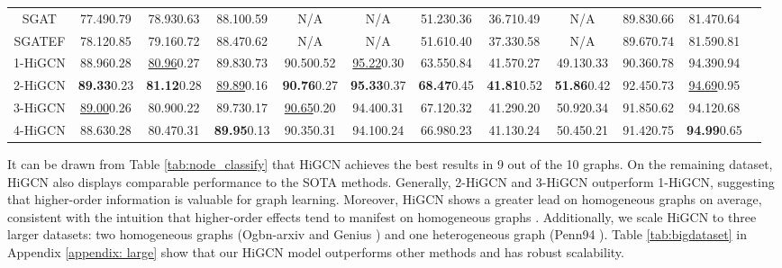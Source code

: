 \documentclass[letterpaper]{article} \usepackage{aaai24}
\newcommand \spm[1] {\footnotesize{#1} }
\newcommand \f[1]{\textbf{#1}}
\newcommand \s[1]{\underline{#1}}
\newcommand \thi[1]{#1}
\theoremstyle{plain}
\theoremstyle{definition}
\theoremstyle{remark}
\begin{document}
\begin{table*}[!ht]
{\begin{tabular}{cccccccccccc}
SGAT &77.49\spm{0.79}  &78.93\spm{0.63} &88.10\spm{0.59} &N/A           &N/A               &51.23\spm{0.36}  &36.71\spm{0.49}  &N/A            &89.83\spm{0.66}  &81.47\spm{0.64}\\
SGATEF &78.12\spm{0.85}  &79.16\spm{0.72} &88.47\spm{0.62} &N/A           &N/A               &51.61\spm{0.40}  &37.33\spm{0.58}  &N/A            &89.67\spm{0.74}  &81.59\spm{0.81}\\
1-HiGCN
&\thi{88.96}\spm{0.28}  &\s{80.96}\spm{0.27}  &\thi{89.83}\spm{0.73}  &\thi{90.50}\spm{0.52}  &\s{95.22}\spm{0.30} &63.55\spm{0.84}  &\thi{41.57}\spm{0.27}  &49.13\spm{0.33}  &90.36\spm{0.78} &\thi{94.39}\spm{0.94}\\
2-HiGCN
&\f{89.33}\spm{0.23}  &\f{81.12}\spm{0.28}  &\s{89.89}\spm{0.16}  &\f{90.76}\spm{0.27}  &\f{95.33}\spm{0.37}  &\f{68.47}\spm{0.45}  &\f{41.81}\spm{0.52}  &\f{51.86}\spm{0.42}  &\thi{92.45}\spm{0.73}      &\s{94.69}\spm{0.95}\\
3-HiGCN
&\s{89.00}\spm{0.26}  &\thi{80.90}\spm{0.22}  &89.73\spm{0.17} &\s{90.65}\spm{0.20} &\thi{94.40}\spm{0.31} &67.12\spm{0.32} &41.29\spm{0.20} &\thi{50.92}\spm{0.34}  &91.85\spm{0.62}          &94.12\spm{0.68}\\
4-HiGCN
&88.63\spm{0.28}  &80.47\spm{0.31}  &\f{89.95}\spm{0.13} &90.35\spm{0.31} &94.10\spm{0.24} &66.98\spm{0.23} &41.13\spm{0.24} &50.45\spm{0.21}  &91.42\spm{0.75}  &\f{94.99}\spm{0.65}\\
\bottomrule
\end{tabular}}
\caption{Node classification results on empirical benchmark networks: mean accuracy  confidence interval. The best results are in bold, while the second-best ones are
underlined.}
\label{tab:node_classify}
\end{table*}



It can be drawn from Table \ref{tab:node_classify} that HiGCN achieves the best results in 9 out of the 10 graphs. 
On the remaining dataset, HiGCN also displays comparable performance to the SOTA methods.
Generally, 2-HiGCN and 3-HiGCN outperform 1-HiGCN, suggesting that higher-order information is valuable for graph learning.
Moreover, HiGCN shows a greater lead on homogeneous graphs on average, consistent with the intuition that higher-order effects tend to manifest on homogeneous graphs \cite{HigherOrderReview2020}.
Additionally, we scale HiGCN to three larger datasets: two homogeneous graphs (Ogbn-arxiv \cite{data:ogbn_arxiv} and Genius \cite{data:genius}) and one heterogeneous graph (Penn94 \cite{data:penn94}). 
Table \ref{tab:bigdataset} in Appendix \ref{appendix: large} show that our HiGCN model outperforms other methods and has robust scalability.
\end{document}
